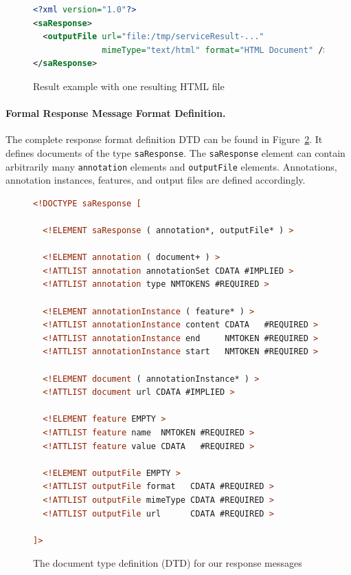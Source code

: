 \begin{figure}
\begin{lstlisting}[language=XML,xleftmargin=8mm,columns=flexible]
<?xml version="1.0"?>
<saResponse>
  <outputFile url="file:/tmp/serviceResult-..."
              mimeType="text/html" format="HTML Document" />
</saResponse>
\end{lstlisting}
\vspace*{-2mm}
\caption{Result example with one resulting HTML file}
\label{list:response3}
\end{figure}


\paragraph{Formal Response Message Format Definition.} The complete
response format definition DTD can be found in
Figure~\ref{list:dtd}. It defines documents of the type
\texttt{saResponse}. The \texttt{saResponse} element can contain
arbitrarily many \texttt{annotation} elements and \texttt{outputFile}
elements. Annotations, annotation instances, features, and output
files are defined accordingly.

\begin{figure}
\begin{lstlisting}[language=XML,xleftmargin=8mm,columns=flexible]
<!DOCTYPE saResponse [

  <!ELEMENT saResponse ( annotation*, outputFile* ) >

  <!ELEMENT annotation ( document+ ) >
  <!ATTLIST annotation annotationSet CDATA #IMPLIED >
  <!ATTLIST annotation type NMTOKENS #REQUIRED >

  <!ELEMENT annotationInstance ( feature* ) >
  <!ATTLIST annotationInstance content CDATA   #REQUIRED >
  <!ATTLIST annotationInstance end     NMTOKEN #REQUIRED >
  <!ATTLIST annotationInstance start   NMTOKEN #REQUIRED >

  <!ELEMENT document ( annotationInstance* ) >
  <!ATTLIST document url CDATA #IMPLIED >

  <!ELEMENT feature EMPTY >
  <!ATTLIST feature name  NMTOKEN #REQUIRED >
  <!ATTLIST feature value CDATA   #REQUIRED >

  <!ELEMENT outputFile EMPTY >
  <!ATTLIST outputFile format   CDATA #REQUIRED >
  <!ATTLIST outputFile mimeType CDATA #REQUIRED >
  <!ATTLIST outputFile url      CDATA #REQUIRED >

]>
\end{lstlisting}
\vspace*{-2mm}
\caption{The document type definition (DTD) for our response messages}
\label{list:dtd}
\end{figure}

